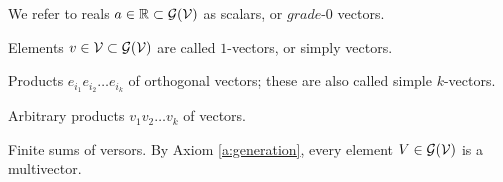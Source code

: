 \begin{definition}[Scalars]
    We refer to reals $a \in \mathbb{R} \subset \mathcal{G}(\mathcal{V})$ as scalars, or $\textit{grade-0}$ vectors.
\end{definition}
\begin{definition}[$1$-vectors]
    Elements $v \in \mathcal{V} \subset \mathcal{G}(\mathcal{V})$ are called $1$-vectors, or simply vectors.
\end{definition}
\begin{definition}[$k$-blades] \label{d:k-blades}
	Products $e_{i_1}e_{i_2} \ldots e_{i_k}$ of orthogonal vectors; these are also called simple $k$-vectors.
\end{definition}
\begin{definition}[Versors]
	Arbitrary products $v_1v_2 \ldots v_k$ of vectors.
\end{definition}
\begin{definition}[Multivectors]
	Finite sums of versors. By Axiom \ref{a:generation}, every element $V \in \mathcal{G}(\mathcal{V})$ is a multivector.
\end{definition}
